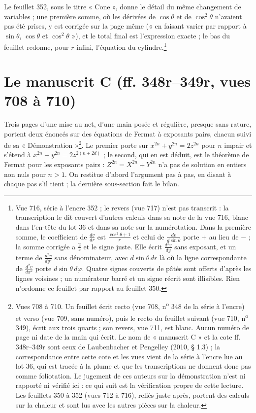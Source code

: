 \documentclass[11pt,a4paper]{article}
\begin{document}
Le feuillet 352, sous le titre « Cone », donne le détail du même changement de
variables ; une première somme, où les dérivées de $\cos\theta$ et de
$\cos^2\theta$ n'avaient pas été prises, y est corrigée sur la page même
(« en faisant varier par rapport à $\sin\theta$, $\cos\theta$ et
$\cos^2\theta$ »), et le total final est l'expression exacte ; le bas du
feuillet redonne, pour $r$ infini, l'équation du cylindre.\footnote{Vue 716,
série à l'encre 352 ; le revers (vue 717) n'est pas transcrit : la
transcription le dit couvert d'autres calculs dans sa note de la vue 716, blanc
dans l'en-tête du lot 36 et dans sa note sur la numérotation. Dans la première somme, le coefficient de $\frac{dv}{dr}$ est
$\frac{\cos^2\theta + 1}{r}$ et celui de $\frac{dv}{d\sin\theta}$ porte $+$
au lieu de $-$ ; la somme corrigée a $\frac2r$ et le signe juste. Elle écrit
$\frac{d^2v}{dy}$ sans exposant, et un terme de $\frac{d^2v}{dy^2}$ sans
dénominateur, avec $d\sin\theta\,dr$ là où la ligne correspondante de
$\frac{d^2v}{dx^2}$ porte $d\sin\theta\,d\varphi$. Quatre signes couverts de
pâtés sont offerts d'après les lignes voisines ; un numérateur barré et un
signe récrit sont illisibles. Rien n'ordonne ce feuillet par rapport au
feuillet 350.}

\section*{Le manuscrit C (ff. 348r--349r, vues 708 à 710)}

Trois pages d'une mise au net, d'une main posée et régulière, presque sans rature, portent deux énoncés sur des équations de Fermat à exposants pairs, chacun suivi de sa « Démonstration »\footnote{Vues 708 à 710. Un feuillet écrit recto (vue 708, n\textsuperscript{o} 348 de la série à l'encre) et verso (vue 709, sans numéro), puis le recto du feuillet suivant (vue 710, n\textsuperscript{o} 349), écrit aux trois quarts ; son revers, vue 711, est blanc. Aucun numéro de page ni date de la main qui écrit. Le nom de « manuscrit C » et la cote ff. 348r--349r sont ceux de Laubenbacher et Pengelley (2010, § 1.3) ; la correspondance entre cette cote et les vues vient de la série à l'encre lue au lot 36, qui est tracée à la plume et que les transcriptions ne donnent donc pas comme foliotation. Le jugement de ces auteurs sur la démonstration n'est ni rapporté ni vérifié ici : ce qui suit est la vérification propre de cette lecture. Les feuillets 350 à 352 (vues 712 à 716), reliés juste après, portent des calculs sur la chaleur et sont lus avec les autres pièces sur la chaleur.}. Le premier porte sur $x^{2n}+y^{2n}=2z^{2n}$ pour $n$ impair et s'étend à $x^{2n}+y^{2n}=2z^{2(n+2d)}$ ; le second, qui en est déduit, est le théorème de Fermat pour les exposants pairs : $Z^{2n}=X^{2n}+Y^{2n}$ n'a pas de solution en entiers non nuls pour $n>1$. On restitue d'abord l'argument pas à pas, en disant à chaque pas s'il tient ; la dernière sous-section fait le bilan.
\end{document}
